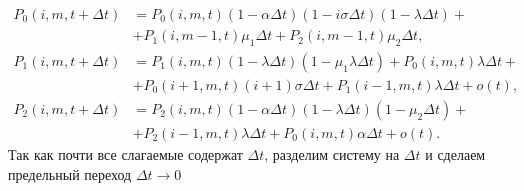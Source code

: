 \begin{equation*} 
	\begin{split}
		P_{0}(i,m,t+\Delta t)&=P_{0}(i,m,t)(1-\alpha\Delta t)(1 - i\sigma\Delta t)(1-\lambda\Delta t) +\\ &+ P_{1}(i,m-1,t)\mu_{1}\Delta t + P_{2}(i,m-1,t)\mu_{2}\Delta t,
		\\
		P_{1}(i,m,t+\Delta t)&=P_{1}(i,m,t)(1-\lambda\Delta t)(1-\mu_{1}\lambda\Delta t)+P_{0}(i,m,t)\lambda\Delta t +\\ &+ P_{0}(i+1,m,t)(i+1)\sigma\Delta t + P_{1}(i-1,m,t)\lambda\Delta t + o(t),
		\\
		P_{2}(i,m,t+\Delta t)&=P_{2}(i,m,t)(1-\alpha\Delta t)(1 - \lambda\Delta t)(1 - \mu_{2}\Delta t) +\\ &+ P_{2}(i-1,m,t)\lambda\Delta t + P_{0}(i,m,t)\alpha\Delta t + o(t).
	\end{split}
\end{equation*}
Так как почти все слагаемые содержат $\Delta t$, разделим систему на $\Delta t$ и сделаем предельный переход $\Delta t \rightarrow 0$

